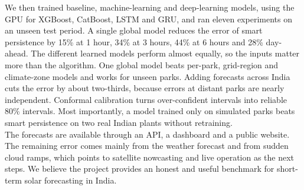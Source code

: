 \documentclass[12pt]{report}
\begin{document}
We then trained baseline, machine-learning and deep-learning models, using the GPU for XGBoost, CatBoost, LSTM and GRU, and ran eleven experiments on an unseen test period. A single global model reduces the error of smart persistence by 15\% at 1 hour, 34\% at 3 hours, 44\% at 6 hours and 28\% day-ahead. The different learned models perform almost equally, so the inputs matter more than the algorithm. One global model beats per-park, grid-region and climate-zone models and works for unseen parks. Adding forecasts across India cuts the error by about two-thirds, because errors at distant parks are nearly independent. Conformal calibration turns over-confident intervals into reliable 80\% intervals. Most importantly, a model trained only on simulated parks beats smart persistence on two real Indian plants without retraining.\\

The forecasts are available through an API, a dashboard and a public website. The remaining error comes mainly from the weather forecast and from sudden cloud ramps, which points to satellite nowcasting and live operation as the next steps. We believe the project provides an honest and useful benchmark for short-term solar forecasting in India.
\end{document}
